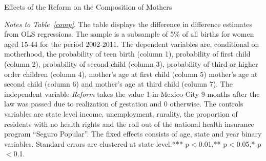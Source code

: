 \documentclass[a4paper, 11pt]{article}
\begin{document}
\begin{spacing}{2}
\begin{table}\caption{Effects of the Reform on the Composition of Mothers}\label{comp}
  \centering
\begin{threeparttable}

\begin{tablenotes}
\footnotesize
\item \textit{Notes to Table~\ref{comp}}. The table displays the difference in difference estimates from OLS regressions. The sample is a subsample of 5\% of all births for women aged 15-44 for the period 2002-2011. The dependent variables are, conditional on motherhood, the probability of teen birth (column 1), probability of first child (column 2), probability of second child (column 3), probability of third or higher order children (column 4), mother's age at first child (column 5) mother's age at second child (column 6) and mother's age at third child (column 7). The independent variable \textit{Reform} takes the value 1 in Mexico City 9 months after the law was passed due to realization of gestation and 0 otherwise.  The controls variables are state level income, unemployment, rurality, the proportion of residents with no health rights and the roll out of the national health insurance program ``Seguro Popular''. The fixed effects consists of age, state and year binary variables. Standard errors are clustered at state level.*** p$<$0.01,** p$<$0.05,* p$<$0.1.
\end{tablenotes} 
\end{threeparttable}
 \end{table} 
 

\end{spacing}
\end{document}
